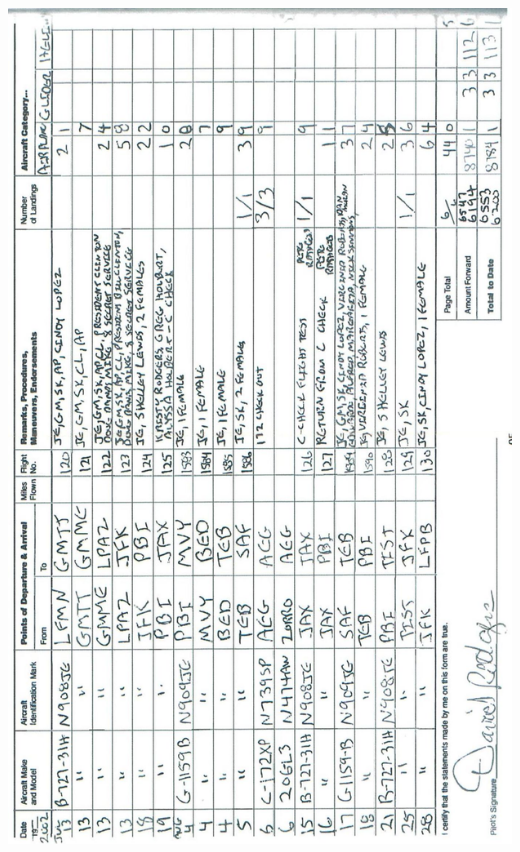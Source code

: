 \documentclass[10pt]{article}
\begin{document}
\includegraphics[max width=\textwidth, center]{2025_02_27_dd68c3d38de88f0516d9g-099}\\
\end{document}
